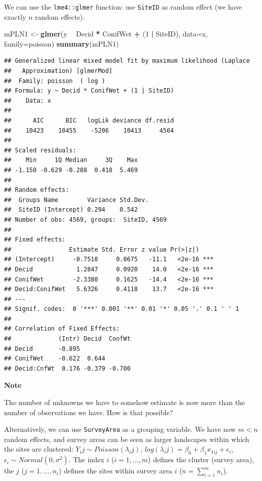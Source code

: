 \documentclass[12pt,]{book}
\newenvironment{Shaded}{\begin{snugshade}}{\end{snugshade}}
\newcommand{\DataTypeTok}[1]{\textcolor[rgb]{0.13,0.29,0.53}{#1}}
\newcommand{\DecValTok}[1]{\textcolor[rgb]{0.00,0.00,0.81}{#1}}
\newcommand{\KeywordTok}[1]{\textcolor[rgb]{0.13,0.29,0.53}{\textbf{#1}}}
\newcommand{\NormalTok}[1]{#1}
\newcommand{\OperatorTok}[1]{\textcolor[rgb]{0.81,0.36,0.00}{\textbf{#1}}}
\newcommand{\StringTok}[1]{\textcolor[rgb]{0.31,0.60,0.02}{#1}}
\let\BeginKnitrBlock\begin \let\EndKnitrBlock\end
\begin{document}
We can use the \texttt{lme4::glmer} function: use \texttt{SiteID} as random effect
(we have exactly \(n\) random effects).

\begin{Shaded}
\begin{Highlighting}[]
\NormalTok{mPLN1 <-}\StringTok{ }\KeywordTok{glmer}\NormalTok{(y }\OperatorTok{~}\StringTok{ }\NormalTok{Decid }\OperatorTok{*}\StringTok{ }\NormalTok{ConifWet }\OperatorTok{+}\StringTok{ }\NormalTok{(}\DecValTok{1} \OperatorTok{|}\StringTok{ }\NormalTok{SiteID), }\DataTypeTok{data=}\NormalTok{x, }\DataTypeTok{family=}\NormalTok{poisson)}
\KeywordTok{summary}\NormalTok{(mPLN1)}
\end{Highlighting}
\end{Shaded}

\begin{verbatim}
## Generalized linear mixed model fit by maximum likelihood (Laplace
##   Approximation) [glmerMod]
##  Family: poisson  ( log )
## Formula: y ~ Decid * ConifWet + (1 | SiteID)
##    Data: x
## 
##      AIC      BIC   logLik deviance df.resid 
##    10423    10455    -5206    10413     4564 
## 
## Scaled residuals: 
##    Min     1Q Median     3Q    Max 
## -1.150 -0.629 -0.288  0.418  5.469 
## 
## Random effects:
##  Groups Name        Variance Std.Dev.
##  SiteID (Intercept) 0.294    0.542   
## Number of obs: 4569, groups:  SiteID, 4569
## 
## Fixed effects:
##                Estimate Std. Error z value Pr(>|z|)    
## (Intercept)     -0.7518     0.0675   -11.1   <2e-16 ***
## Decid            1.2847     0.0920    14.0   <2e-16 ***
## ConifWet        -2.3380     0.1625   -14.4   <2e-16 ***
## Decid:ConifWet   5.6326     0.4118    13.7   <2e-16 ***
## ---
## Signif. codes:  0 '***' 0.001 '**' 0.01 '*' 0.05 '.' 0.1 ' ' 1
## 
## Correlation of Fixed Effects:
##             (Intr) Decid  ConfWt
## Decid       -0.895              
## ConifWet    -0.622  0.644       
## Decid:CnfWt  0.176 -0.379 -0.700
\end{verbatim}

\BeginKnitrBlock{rmdnote}
\textbf{Note}

The number of unknowns we have to somehow estimate is now more than the number of observations we have. How is that possible?
\EndKnitrBlock{rmdnote}

Alternatively, we can use \texttt{SurveyArea} as a grouping variable.
We have now \(m < n\) random effects, and survey areas can be seen
as larger landscapes within which the sites are clustered:
\(Y_ij\sim Poisson(\lambda_ij)\),
\(log(\lambda_ij) = \beta_0+\beta_1 x_{1ij}+\epsilon_i\),
\(\epsilon_i \sim Normal(0, \sigma^2)\).
The index \(i\) (\(i=1,...,m\)) defines the cluster (survey area),
the \(j\) (\(j=1,...,n_i\)) defines the sites within survey area \(i\)
(\(n = \sum_{i=1}^m n_i\)).
\end{document}
